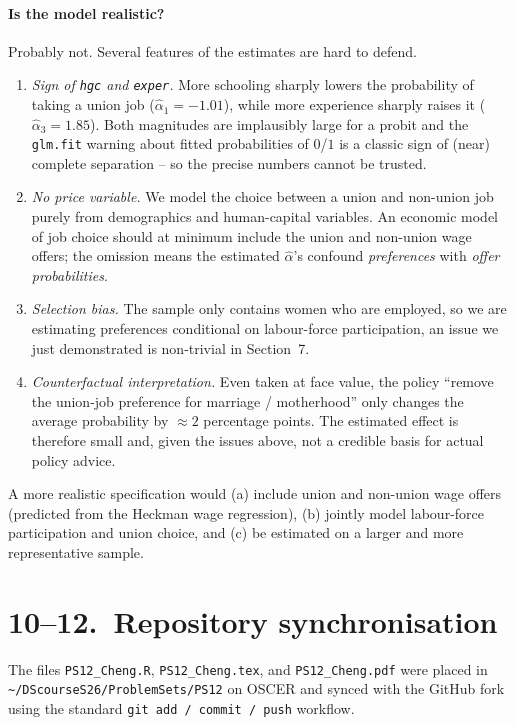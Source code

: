 \documentclass[11pt]{article}
\begin{document}
\paragraph{Is the model realistic?}  Probably not.  Several features of the
estimates are hard to defend.
\begin{enumerate}\itemsep 2pt
    \item \emph{Sign of \texttt{hgc} and \texttt{exper}.}  More schooling
    sharply lowers the probability of taking a union job ($\hat{\alpha}_1 =
    -1.01$), while more experience sharply raises it ($\hat{\alpha}_3 =
    1.85$).  Both magnitudes are implausibly large for a probit and the
    \texttt{glm.fit} warning about fitted probabilities of $0$/$1$ is a
    classic sign of (near) complete separation -- so the precise numbers
    cannot be trusted.
    \item \emph{No price variable.}  We model the choice between a union and
    non-union job purely from demographics and human-capital variables.  An
    economic model of job choice should at minimum include the union and
    non-union wage offers; the omission means the estimated $\hat{\alpha}$'s
    confound \emph{preferences} with \emph{offer probabilities}.
    \item \emph{Selection bias.}  The sample only contains women who are
    employed, so we are estimating preferences conditional on labour-force
    participation, an issue we just demonstrated is non-trivial in
    Section~7.
    \item \emph{Counterfactual interpretation.}  Even taken at face value,
    the policy ``remove the union-job preference for marriage / motherhood''
    only changes the average probability by $\approx 2$ percentage points.
    The estimated effect is therefore small and, given the issues above,
    not a credible basis for actual policy advice.
\end{enumerate}
A more realistic specification would (a) include union and non-union wage
offers (predicted from the Heckman wage regression), (b) jointly model
labour-force participation and union choice, and (c) be estimated on a
larger and more representative sample.

\section*{10--12.\ Repository synchronisation}
The files \texttt{PS12\_Cheng.R}, \texttt{PS12\_Cheng.tex}, and
\texttt{PS12\_Cheng.pdf} were placed in
\verb|~/DScourseS26/ProblemSets/PS12| on OSCER and synced with the GitHub
fork using the standard \texttt{git add / commit / push} workflow.
\end{document}

